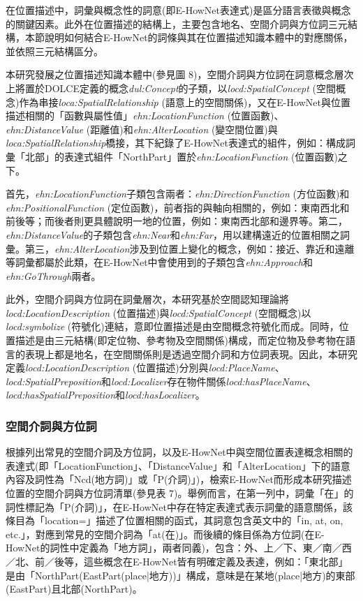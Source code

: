 在位置描述中，詞彙與概念性的詞意(即E-HowNet表達式)是區分語言表徵與概念的關鍵因素。此外在位置描述的結構上，主要包含地名、空間介詞與方位詞三元結構，本節說明如何結合E-HowNet的詞條與其在位置描述知識本體中的對應關係，並依照三元結構區分。

本研究發展之位置描述知識本體中(參見圖 8)，空間介詞與方位詞在詞意概念層次上將置於DOLCE定義的概念\textit{dul:Concept}的子類，以\textit{locd:SpatialConcept} (空間概念)作為串接\textit{loca:SpatialRelationship} (語意上的空間關係)，又在E-HowNet與位置描述相關的「函數與屬性值」\textit{ehn:LocationFunction} (位置函數)、\textit{ehn:DistanceValue} (距離值)和\textit{ehn:AlterLocation} (變空間位置)與\textit{loca:SpatialRelationship}橋接，其下紀錄了E-HowNet表達式的組件，例如：構成詞彙「北部」的表達式組件「NorthPart」置於\textit{ehn:LocationFunction} (位置函數)之下。

首先，\textit{ehn:LocationFunction}子類包含兩者：\textit{ehn:DirectionFunction} (方位函數)和\textit{ehn:PositionalFunction} (定位函數)，前者指的與軸向相關的，例如：東南西北和前後等；而後者則更具體說明一地的位置，例如：東南西北部和邊界等。第二，\textit{ehn:DistanceValue}的子類包含\textit{ehn:Near}和\textit{ehn:Far}，用以建構遠近的位置相關之詞彙。第三，\textit{ehn:AlterLocation}涉及到位置上變化的概念，例如：接近、靠近和遠離等詞彙都屬於此類，在E-HowNet中會使用到的子類包含\textit{ehn:Approach}和\textit{ehn:GoThrough}兩者。

此外，空間介詞與方位詞在詞彙層次，本研究基於空間認知理論將\textit{locd:LocationDescription} (位置描述)與\textit{locd:SpatialConcept} (空間概念)以\textit{locd:symbolize} (符號化)連結，意即位置描述是由空間概念符號化而成。同時，位置描述是由三元結構(即定位物、參考物及空間關係)構成，而定位物及參考物在語言的表現上都是地名，在空間關係則是透過空間介詞和方位詞表現。因此，本研究定義\textit{locd:LocationDescription} (位置描述)分別與\textit{locd:PlaceName}、\textit{locd:SpatialPreposition}和\textit{locd:Localizer}存在物件關係\textit{locd:hasPlaceName}、\textit{locd:hasSpatialPreposition}和\textit{locd:hasLocalizer}。

\subsubsection{空間介詞與方位詞}

根據\citet{RN45}列出常見的空間介詞及方位詞，以及E-HowNet中與空間位置表達概念相關的表達式(即「LocationFunction」、「DistanceValue」和「AlterLocation」下的語意內容及詞性為「Ncd(地方詞)」或「P(介詞)」)，檢索E-HowNet而形成本研究描述位置的空間介詞與方位詞清單(參見表 7)。舉例而言，在第一列中，詞彙「在」的詞性標記為「P(介詞)」，在E-HowNet中存在特定表達式表示詞彙的語意關係，該條目為「location={}」描述了位置相關的函式，其詞意包含英文中的「in, at, on, etc.」，對應到常見的空間介詞為「at(在)」。而後續的條目係為方位詞(在E-HowNet的詞性中定義為「地方詞」，兩者同義)，包含：外、上／下、東／南／西／北、前／後等，這些概念在E-HowNet皆有明確定義及表達，例如：「東北部」是由「{NorthPart({EastPart({place|地方})})}」構成，意味是在某地(place|地方)的東部(EastPart)且北部(NorthPart)。

